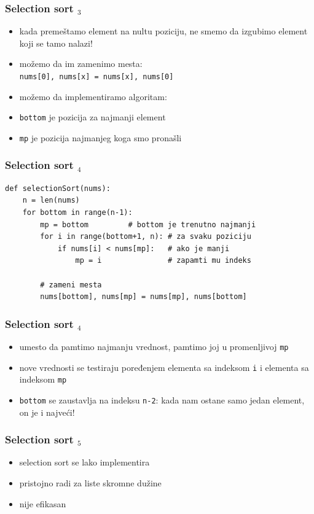 \documentclass[utf8,compress,aspectratio=169]{beamer}
\begin{document}
\begin{frame}[fragile]
  \frametitle{Selection sort $_3$}
  \begin{itemize}
    \item kada premeštamo element na nultu poziciju, ne smemo da izgubimo element koji se tamo nalazi!
    \item možemo da im zamenimo mesta: \\
      \texttt{nums[0], nums[x] = nums[x], nums[0]}
    \item možemo da implementiramo algoritam:
    \item \texttt{bottom} je pozicija za najmanji element
    \item \texttt{mp} je pozicija najmanjeg koga smo pronašli
  \end{itemize}
\end{frame}

\begin{frame}[fragile]
  \frametitle{Selection sort $_4$}
\begin{verbatim}
def selectionSort(nums):
    n = len(nums)
    for bottom in range(n-1):
        mp = bottom         # bottom je trenutno najmanji
        for i in range(bottom+1, n): # za svaku poziciju
            if nums[i] < nums[mp]:   # ako je manji
                mp = i               # zapamti mu indeks

        # zameni mesta
        nums[bottom], nums[mp] = nums[mp], nums[bottom]
\end{verbatim}
\end{frame}

\begin{frame}[fragile]
  \frametitle{Selection sort $_4$}
  \begin{itemize}
    \item umesto da pamtimo najmanju vrednost, pamtimo joj  u promenljivoj \texttt{mp}
    \item nove vrednosti se testiraju poređenjem elementa sa indeksom \texttt{i} i elementa sa indeksom \texttt{mp}
    \item \texttt{bottom} se zaustavlja na indeksu \texttt{n-2}: kada nam ostane samo jedan element, on je i najveći!
  \end{itemize}
\end{frame}

\begin{frame}[fragile]
  \frametitle{Selection sort $_5$}
  \begin{itemize}
    \item selection sort se lako implementira
    \item pristojno radi za liste skromne dužine
    \item nije efikasan
  \end{itemize}
\end{frame}
\end{document}
